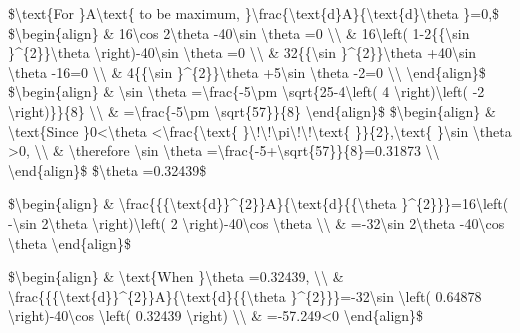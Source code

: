 \$\textbackslash text\{For \}A\textbackslash text\{ to be maximum,
\}\textbackslash frac\{\textbackslash text\{d\}A\}\{\textbackslash text\{d\}\textbackslash theta
\}=0,\$ \$\textbackslash begin\{align\} \& 16\textbackslash cos
2\textbackslash theta -40\textbackslash sin \textbackslash theta
=0 \textbackslash\textbackslash{} \& 16\textbackslash left( 1-2\{\{\textbackslash sin
\}\textasciicircum\{2\}\}\textbackslash theta \textbackslash right)-40\textbackslash sin
\textbackslash theta =0 \textbackslash\textbackslash{} \& 32\{\{\textbackslash sin
\}\textasciicircum\{2\}\}\textbackslash theta +40\textbackslash sin
\textbackslash theta -16=0 \textbackslash\textbackslash{} \& 4\{\{\textbackslash sin
\}\textasciicircum\{2\}\}\textbackslash theta +5\textbackslash sin
\textbackslash theta -2=0 \textbackslash\textbackslash{} \textbackslash end\{align\}\$
\$\textbackslash begin\{align\} \& \textbackslash sin \textbackslash theta
=\textbackslash frac\{-5\textbackslash pm \textbackslash sqrt\{25-4\textbackslash left(
4 \textbackslash right)\textbackslash left( -2 \textbackslash right)\}\}\{8\}
\textbackslash\textbackslash{} \& =\textbackslash frac\{-5\textbackslash pm
\textbackslash sqrt\{57\}\}\{8\} \textbackslash end\{align\}\$ \$\textbackslash begin\{align\}
\& \textbackslash text\{Since \}0<\textbackslash theta <\textbackslash frac\{\textbackslash text\{
\}\textbackslash !\textbackslash !\textbackslash pi\textbackslash !\textbackslash !\textbackslash text\{
\}\}\{2\},\textbackslash text\{ \}\textbackslash sin \textbackslash theta
>0, \textbackslash\textbackslash{} \& \textbackslash therefore
\textbackslash sin \textbackslash theta =\textbackslash frac\{-5+\textbackslash sqrt\{57\}\}\{8\}=0.31873
\textbackslash\textbackslash{} \textbackslash end\{align\}\$ \$\textbackslash theta
=0.32439\$ 

\$\textbackslash begin\{align\} \& \textbackslash frac\{\{\{\textbackslash text\{d\}\}\textasciicircum\{2\}\}A\}\{\textbackslash text\{d\}\{\{\textbackslash theta
\}\textasciicircum\{2\}\}\}=16\textbackslash left( -\textbackslash sin
2\textbackslash theta \textbackslash right)\textbackslash left(
2 \textbackslash right)-40\textbackslash cos \textbackslash theta
\textbackslash\textbackslash{} \& =-32\textbackslash sin 2\textbackslash theta
-40\textbackslash cos \textbackslash theta \textbackslash end\{align\}\$ 

\$\textbackslash begin\{align\} \& \textbackslash text\{When \}\textbackslash theta
=0.32439, \textbackslash\textbackslash{} \& \textbackslash frac\{\{\{\textbackslash text\{d\}\}\textasciicircum\{2\}\}A\}\{\textbackslash text\{d\}\{\{\textbackslash theta
\}\textasciicircum\{2\}\}\}=-32\textbackslash sin \textbackslash left(
0.64878 \textbackslash right)-40\textbackslash cos \textbackslash left(
0.32439 \textbackslash right) \textbackslash\textbackslash{} \&
=-57.249<0 \textbackslash end\{align\}\$ 


